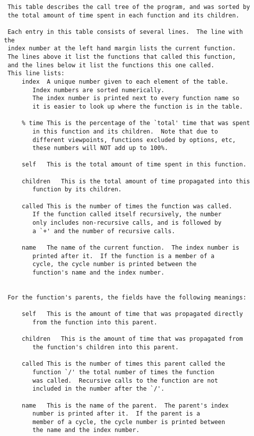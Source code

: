 \documentclass{report}
\begin{document}
\begin{verbatim}
 This table describes the call tree of the program, and was sorted by
 the total amount of time spent in each function and its children.

 Each entry in this table consists of several lines.  The line with the
 index number at the left hand margin lists the current function.
 The lines above it list the functions that called this function,
 and the lines below it list the functions this one called.
 This line lists:
     index	A unique number given to each element of the table.
		Index numbers are sorted numerically.
		The index number is printed next to every function name so
		it is easier to look up where the function is in the table.

     % time	This is the percentage of the `total' time that was spent
		in this function and its children.  Note that due to
		different viewpoints, functions excluded by options, etc,
		these numbers will NOT add up to 100%.

     self	This is the total amount of time spent in this function.

     children	This is the total amount of time propagated into this
		function by its children.

     called	This is the number of times the function was called.
		If the function called itself recursively, the number
		only includes non-recursive calls, and is followed by
		a `+' and the number of recursive calls.

     name	The name of the current function.  The index number is
		printed after it.  If the function is a member of a
		cycle, the cycle number is printed between the
		function's name and the index number.


 For the function's parents, the fields have the following meanings:

     self	This is the amount of time that was propagated directly
		from the function into this parent.

     children	This is the amount of time that was propagated from
		the function's children into this parent.

     called	This is the number of times this parent called the
		function `/' the total number of times the function
		was called.  Recursive calls to the function are not
		included in the number after the `/'.

     name	This is the name of the parent.  The parent's index
		number is printed after it.  If the parent is a
		member of a cycle, the cycle number is printed between
		the name and the index number.


\end{verbatim}
\end{document}
